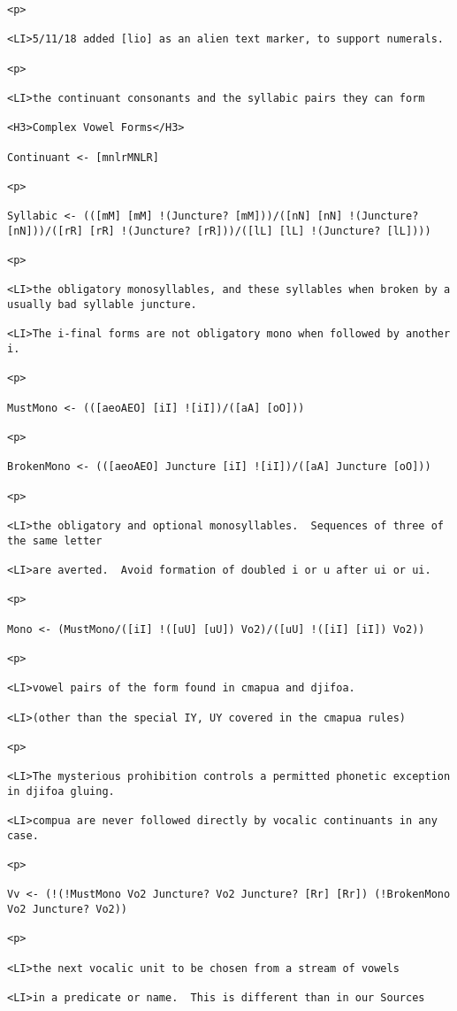 \documentclass[12pt]{article}
\begin{document}
\begin{lstlisting}
<p>

<LI>5/11/18 added [lio] as an alien text marker, to support numerals.

<p>

<LI>the continuant consonants and the syllabic pairs they can form

<H3>Complex Vowel Forms</H3>

Continuant <- [mnlrMNLR]

<p>

Syllabic <- (([mM] [mM] !(Juncture? [mM]))/([nN] [nN] !(Juncture? [nN]))/([rR] [rR] !(Juncture? [rR]))/([lL] [lL] !(Juncture? [lL])))

<p>

<LI>the obligatory monosyllables, and these syllables when broken by a usually bad syllable juncture.

<LI>The i-final forms are not obligatory mono when followed by another i.

<p>

MustMono <- (([aeoAEO] [iI] ![iI])/([aA] [oO]))

<p>

BrokenMono <- (([aeoAEO] Juncture [iI] ![iI])/([aA] Juncture [oO]))

<p>

<LI>the obligatory and optional monosyllables.  Sequences of three of the same letter

<LI>are averted.  Avoid formation of doubled i or u after ui or ui.

<p>

Mono <- (MustMono/([iI] !([uU] [uU]) Vo2)/([uU] !([iI] [iI]) Vo2))

<p>

<LI>vowel pairs of the form found in cmapua and djifoa.

<LI>(other than the special IY, UY covered in the cmapua rules)

<p>

<LI>The mysterious prohibition controls a permitted phonetic exception in djifoa gluing.

<LI>compua are never followed directly by vocalic continuants in any case.

<p>

Vv <- (!(!MustMono Vo2 Juncture? Vo2 Juncture? [Rr] [Rr]) (!BrokenMono Vo2 Juncture? Vo2))

<p>

<LI>the next vocalic unit to be chosen from a stream of vowels

<LI>in a predicate or name.  This is different than in our Sources


\end{lstlisting}
\end{document}
